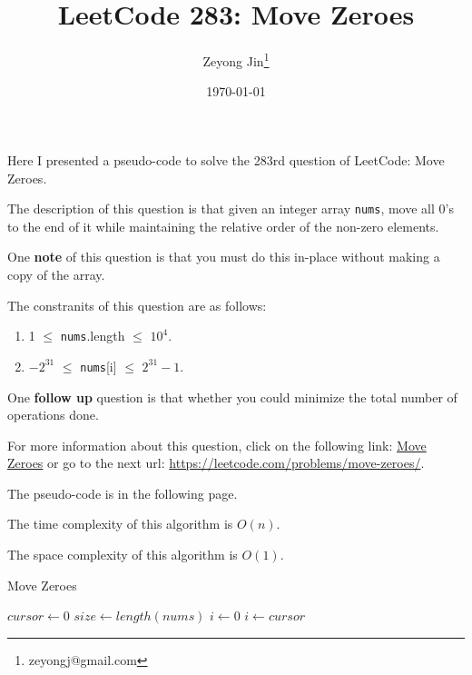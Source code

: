\documentclass{article}
\title{LeetCode 283: Move Zeroes}
\author{Zeyong Jin\thanks{zeyongj@gmail.com}}
\affil{School of Computing Sciences, Simon Fraser University}
\date{\today}
\begin{document}
\maketitle

Here I presented a pseudo-code to solve the 283rd question of LeetCode: Move Zeroes.

The description of this question is that given an integer array  \texttt{nums}, move all 0's to the end of it while maintaining the relative order of the non-zero elements.

One \textbf{note} of this question is that you must do this in-place without making a copy of the array.


The constranits of this question are as follows:
\begin{enumerate}[label=(\alph*),leftmargin=2\parindent]
   \item 1 $\leq$ \texttt{nums}.length $\leq$ $10^{4}$.
   \item $-2^{31}$ $\leq$ \texttt{nums}[i] $\leq$ $2^{31} - 1$.
\end{enumerate}

One \textbf{follow up} question is that whether you could minimize the total number of operations done.

For more information about this question, click on the following link: 
    \href{https://leetcode.com/problems/move-zeroes/}{Move Zeroes} or go to the next url: \url{https://leetcode.com/problems/move-zeroes/}.

The pseudo-code is in the following page.

The time complexity of this algorithm is $O(n)$.

The space complexity of this algorithm is $O(1)$.


{}

\begin{algorithm}[hbt!]
\caption{Move Zeroes}\label{alg:two}
\LinesNumbered
{}
$cursor \gets 0$\;
$size \gets length(nums)$\;
$i \gets 0$\;
$i \gets cursor$\ 

\end{algorithm}
\end{document}
